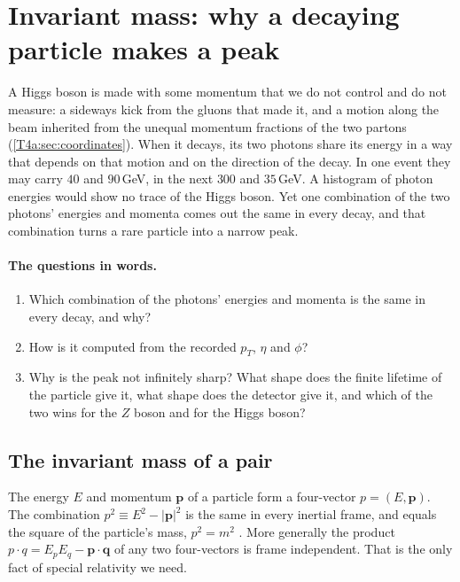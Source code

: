 \section{Invariant mass: why a decaying particle makes a peak}
\label{T4a:sec:mass}

A Higgs boson is made with some momentum that we do not control and do not measure: a sideways kick from the gluons that made it, and a motion along the beam inherited from the unequal momentum fractions of the two partons (\cref{T4a:sec:coordinates}). When it decays, its two photons share its energy in a way that depends on that motion and on the direction of the decay. In one event they may carry $40$ and $90$\,GeV, in the next $300$ and $35$\,GeV. A histogram of photon energies would show no trace of the Higgs boson. Yet one combination of the two photons' energies and momenta comes out the same in every decay, and that combination turns a rare particle into a narrow peak.

\paragraph{The questions in words.}
\begin{enumerate}[label=\arabic*.]
  \item Which combination of the photons' energies and momenta is the same in every decay, and why?
  \item How is it computed from the recorded $p_T$, $\eta$ and $\phi$?
  \item Why is the peak not infinitely sharp? What shape does the finite lifetime of the particle give it, what shape does the detector give it, and which of the two wins for the $Z$ boson and for the Higgs boson?
\end{enumerate}

\subsection{The invariant mass of a pair}
\label{T4a:sec:minv}

The energy $E$ and momentum $\bm p$ of a particle form a four-vector $p=(E,\bm p)$. The combination $p^2\equiv E^2-\lvert\bm p\rvert^2$ is the same in every inertial frame, and equals the square of the particle's mass, $p^2=m^2$ \cite[\S49.1]{PDG2024}. More generally the product $p\cdot q=E_pE_q-\bm p\cdot\bm q$ of any two four-vectors is frame independent. That is the only fact of special relativity we need.

